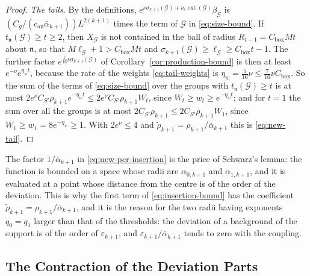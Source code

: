 \documentclass[11pt]{preprint}
\numberwithin{equation}{section}
\theoremstyle{definition}
\theoremstyle{remark}
\theoremstyle{plain}
\begin{document}
\begin{proof}
\emph{The tails.} By the definitions, $e^{\nu\sigma_{k+1}(\mathcal G) + \nu_e\operatorname{ext}(\mathcal G)}\beta_{\mathcal G}$ is $(C_g/(c_{\mathrm{an}}\bar\alpha_{k+1}))L^{2(k+1)}$ times the term of $\mathcal G$ in \eqref{eq:size-bound}. If $t_{\mathfrak n}(\mathcal G) \geq t \geq 2$, then $X_{\mathcal G}$ is not contained in the ball of radius $R_{t-1} = C_{\mathrm{box}}Mt$ about $\mathfrak n$, so that $M\ell_{\mathcal G} + 1 > C_{\mathrm{box}}Mt$ and $\sigma_{k+1}(\mathcal G) \geq \ell_{\mathcal G} \geq C_{\mathrm{box}}t - 1$. The further factor $e^{\frac{7}{16}\nu\sigma_{k+1}(\mathcal G)}$ of Corollary~\ref{cor:production-bound} is then at least $e^{-\nu}e^{\eta_wt}$, because the rate of the weights \eqref{eq:tail-weights} is $\eta_w = \frac{5}{16}\nu \leq \frac{7}{16}\nu C_{\mathrm{box}}$. So the sum of the terms of \eqref{eq:size-bound} over the groups with $t_{\mathfrak n}(\mathcal G) \geq t$ is at most $2e^\nu C_{S'}\rho_{k+1}e^{-\eta_wt} \leq 2e^\nu C_{S'}\rho_{k+1}W_t$, since $W_t \geq w_t \geq e^{-\eta_wt}$; and for $t = 1$ the sum over all the groups is at most $2C_{S'}\rho_{k+1} \leq 2C_{S'}\rho_{k+1}W_1$, since $W_1 \geq w_1 = 8e^{-\eta_w} \geq 1$. With $2e^\nu \leq 4$ and $\tilde\rho_{k+1} = \rho_{k+1}/\bar\alpha_{k+1}$ this is \eqref{eq:new-tail}.
\end{proof}

The factor $1/\bar\alpha_{k+1}$ in \eqref{eq:new-per-insertion} is the price of Schwarz's lemma: the function is bounded on a space whose radii are $\alpha_{0,k+1}$ and $\alpha_{1,k+1}$, and it is evaluated at a point whose distance from the centre is of the order of the deviation. This is why the first term of \eqref{eq:insertion-bound} has the coefficient $\tilde\rho_{k+1} = \rho_{k+1}/\bar\alpha_{k+1}$, and it is the reason for the two radii having exponents $q_0 = q_1$ larger than that of the thresholds: the deviation of a background of the support is of the order of $\varepsilon_{k+1}$, and $\varepsilon_{k+1}/\bar\alpha_{k+1}$ tends to zero with the coupling.

\subsection{The Contraction of the Deviation Parts}\label{sec:contraction}
\end{document}

